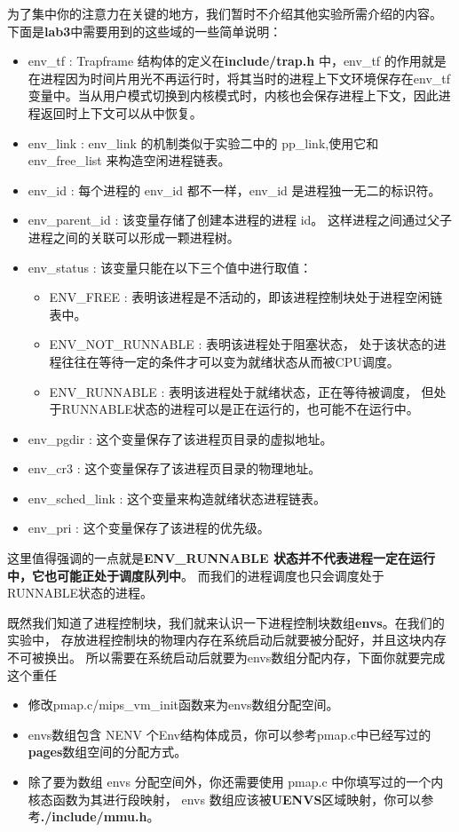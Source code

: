 为了集中你的注意力在关键的地方，我们暂时不介绍其他实验所需介绍的内容。
下面是\textbf{lab3}中需要用到的这些域的一些简单说明：

\begin{itemize}
  \item env\_tf : Trapframe 结构体的定义在\textbf{include/trap.h} 中，env\_tf 的作用就是在进程因为时间片用光不再运行时，将其当时的进程上下文环境保存在env\_tf 变量中。当从用户模式切换到内核模式时，内核也会保存进程上下文，因此进程返回时上下文可以从中恢复。
  \item env\_link : env\_link 的机制类似于实验二中的 pp\_link,使用它和 env\_free\_list 来构造空闲进程链表。
  \item env\_id : 每个进程的 env\_id 都不一样，env\_id 是进程独一无二的标识符。
  \item env\_parent\_id : 该变量存储了创建本进程的进程 id。
  这样进程之间通过父子进程之间的关联可以形成一颗进程树。
  \item env\_status : 该变量只能在以下三个值中进行取值：
  \begin{itemize}
    \item ENV\_FREE : 表明该进程是不活动的，即该进程控制块处于进程空闲链表中。
    \item ENV\_NOT\_RUNNABLE : 表明该进程处于阻塞状态，
    处于该状态的进程往往在等待一定的条件才可以变为就绪状态从而被CPU调度。
    \item ENV\_RUNNABLE : 表明该进程处于就绪状态，正在等待被调度，
    但处于RUNNABLE状态的进程可以是正在运行的，也可能不在运行中。
  \end{itemize}
  \item env\_pgdir : 这个变量保存了该进程页目录的虚拟地址。
  \item env\_cr3 : 这个变量保存了该进程页目录的物理地址。
  \item env\_sched\_link : 这个变量来构造就绪状态进程链表。
  \item env\_pri :  这个变量保存了该进程的优先级。
\end{itemize}

这里值得强调的一点就是\textbf{ENV\_RUNNABLE 状态并不代表进程一定在运行中，它也可能正处于调度队列中}。
而我们的进程调度也只会调度处于RUNNABLE状态的进程。

既然我们知道了进程控制块，我们就来认识一下进程控制块数组\textbf{envs}。在我们的实验中，
存放进程控制块的物理内存在系统启动后就要被分配好，并且这块内存不可被换出。
所以需要在系统启动后就要为envs数组分配内存，下面你就要完成这个重任

\begin{exercise}
  \begin{itemize}
    \item 修改pmap.c/mips\_vm\_init函数来为envs数组分配空间。
    \item envs数组包含 NENV 个Env结构体成员，你可以参考pmap.c中已经写过的\textbf{pages}数组空间的分配方式。
    \item 除了要为数组 envs 分配空间外，你还需要使用 pmap.c 中你填写过的一个内核态函数为其进行段映射，
    envs 数组应该被\textbf{UENVS}区域映射，你可以参考\textbf{./include/mmu.h}。	
  \end{itemize}
\end{exercise}

